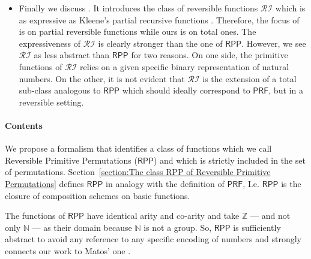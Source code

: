 \documentclass[runningheads]{llncs}
\newcommand{\RPP}{\textsf{RPP}\xspace}
\newcommand{\PRF}{\textsf{PRF}\xspace}
\newcommand{\Nat}{\mathbb{N}}
\newcommand{\Int}{\mathbb{Z}}
\newcommand{\JMF}{\mathcal{RI}} %
\begin{document}
\begin{itemize}
    \item
    Finally we discuss \cite{jacopini89tcs}.
    It introduces the class of reversible functions $ \JMF $ which is as expressive as Kleene's
    partial recursive functions \cite{cutland1980book,odifreddi1989book}.
    Therefore, the focus of \cite{jacopini89tcs} is on partial reversible functions while ours  is on total ones.
    The expressiveness of $ \JMF $ is clearly stronger than the one of  $ \RPP $.
    However, we see $ \JMF $ as less abstract than $ \RPP $ for two reasons.
    On one side, the primitive functions of $ \JMF $ relies on a given specific binary representation of natural numbers.
    On the other, it is not evident that $ \JMF $ is the extension of a total sub-class
    analogous to $ \RPP $ which should ideally correspond to $ \PRF $, but in a reversible setting.
\end{itemize}

\paragraph{Contents}
We propose a formalism that identifies a class of functions which we call Reversible Primitive Permutations
($ \RPP $) and which is strictly included in the set of permutations.
Section~\ref{section:The class RPP of Reversible Primitive Permutations} defines $ \RPP $ in analogy
with the definition of $ \PRF $, I.e. $ \RPP $ is the closure of composition schemes on basic functions.

The functions of $ \RPP $ have identical arity and co-arity and take
$ \Int $ --- and not only $ \Nat $ --- as their
domain because $ \Nat $ is not a group. So, $ \RPP $ is sufficiently abstract
to avoid any reference to any specific
encoding of numbers and strongly connects our work to Matos' one \cite{matos03tcs}.
\end{document}
